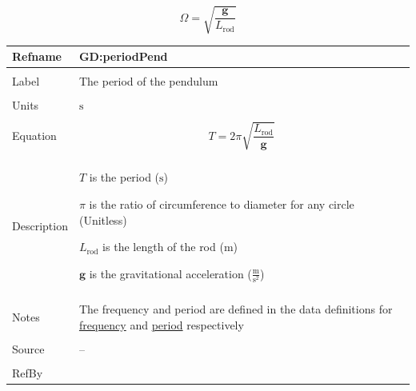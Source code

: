 \documentclass[12pt]{article}
\begin{document}
\begin{displaymath}
Ω=\sqrt{\frac{\symbf{g}}{{L_{\text{rod}}}}}
\end{displaymath}
\vspace{\baselineskip}
\noindent
\begin{minipage}{\textwidth}
\begin{tabular}{>{\raggedright}p{}>{\raggedright\arraybackslash}p{}}
\toprule \textbf{Refname} & \textbf{GD:periodPend}
\label{GD:periodPend}
\\ \midrule \\
Label & The period of the pendulum
        
\\ \midrule \\
Units & ${\text{s}}$
        
\\ \midrule \\
Equation & \begin{displaymath}
           T=2 π \sqrt{\frac{{L_{\text{rod}}}}{\symbf{g}}}
           \end{displaymath}
\\ \midrule \\
Description & \begin{symbDescription}
              \item{$T$ is the period (${\text{s}}$)}
              \item{$π$ is the ratio of circumference to diameter for any circle (Unitless)}
              \item{${L_{\text{rod}}}$ is the length of the rod (${\text{m}}$)}
              \item{$\symbf{g}$ is the gravitational acceleration ($\frac{\text{m}}{\text{s}^{2}}$)}
              \end{symbDescription}
\\ \midrule \\
Notes & The frequency and period are defined in the data definitions for \hyperref[DD:frequencyDD]{frequency} and \hyperref[DD:periodSHMDD]{period} respectively
        
\\ \midrule \\
Source & --
         
\\ \midrule \\
RefBy & 
\\ \bottomrule
\end{tabular}
\end{minipage}
\end{document}
